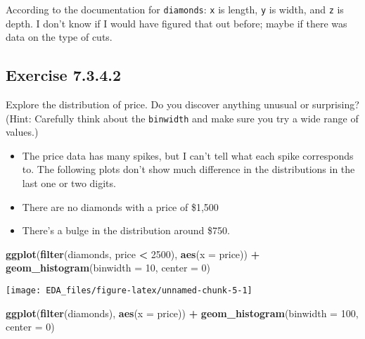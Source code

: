 \documentclass[]{book}
\newenvironment{Shaded}{\begin{snugshade}}{\end{snugshade}}
\newcommand{\DataTypeTok}[1]{\textcolor[rgb]{0.13,0.29,0.53}{#1}}
\newcommand{\DecValTok}[1]{\textcolor[rgb]{0.00,0.00,0.81}{#1}}
\newcommand{\KeywordTok}[1]{\textcolor[rgb]{0.13,0.29,0.53}{\textbf{#1}}}
\newcommand{\NormalTok}[1]{#1}
\newcommand{\OperatorTok}[1]{\textcolor[rgb]{0.81,0.36,0.00}{\textbf{#1}}}
\newcommand{\StringTok}[1]{\textcolor[rgb]{0.31,0.60,0.02}{#1}}
\providecommand{\tightlist}{%
  \setlength{\itemsep}{0pt}\setlength{\parskip}{0pt}}
\theoremstyle{plain}
\theoremstyle{remark}
\begin{document}
According to the documentation for \texttt{diamonds}: \texttt{x} is
length, \texttt{y} is width, and \texttt{z} is depth. I don't know if I
would have figured that out before; maybe if there was data on the type
of cuts.

\hypertarget{exercise-7.3.4.2}{%
\subsection*{\texorpdfstring{Exercise
{7.3.4.2}}{Exercise 7.3.4.2}}\label{exercise-7.3.4.2}}

Explore the distribution of price. Do you discover anything unusual or
surprising? (Hint: Carefully think about the \texttt{binwidth} and make
sure you try a wide range of values.)

\begin{itemize}
\tightlist
\item
  The price data has many spikes, but I can't tell what each spike
  corresponds to. The following plots don't show much difference in the
  distributions in the last one or two digits.
\item
  There are no diamonds with a price of \$1,500
\item
  There's a bulge in the distribution around \$750.
\end{itemize}

\begin{Shaded}
\begin{Highlighting}[]
\KeywordTok{ggplot}\NormalTok{(}\KeywordTok{filter}\NormalTok{(diamonds, price }\OperatorTok{<}\StringTok{ }\DecValTok{2500}\NormalTok{), }\KeywordTok{aes}\NormalTok{(}\DataTypeTok{x =}\NormalTok{ price)) }\OperatorTok{+}
\StringTok{  }\KeywordTok{geom_histogram}\NormalTok{(}\DataTypeTok{binwidth =} \DecValTok{10}\NormalTok{, }\DataTypeTok{center =} \DecValTok{0}\NormalTok{)}
\end{Highlighting}
\end{Shaded}

\begin{center}\texttt{[image: EDA\_files/figure-latex/unnamed-chunk-5-1]} \end{center}

\begin{Shaded}
\begin{Highlighting}[]
\KeywordTok{ggplot}\NormalTok{(}\KeywordTok{filter}\NormalTok{(diamonds), }\KeywordTok{aes}\NormalTok{(}\DataTypeTok{x =}\NormalTok{ price)) }\OperatorTok{+}
\StringTok{  }\KeywordTok{geom_histogram}\NormalTok{(}\DataTypeTok{binwidth =} \DecValTok{100}\NormalTok{, }\DataTypeTok{center =} \DecValTok{0}\NormalTok{)}
\end{Highlighting}
\end{Shaded}
\end{document}
